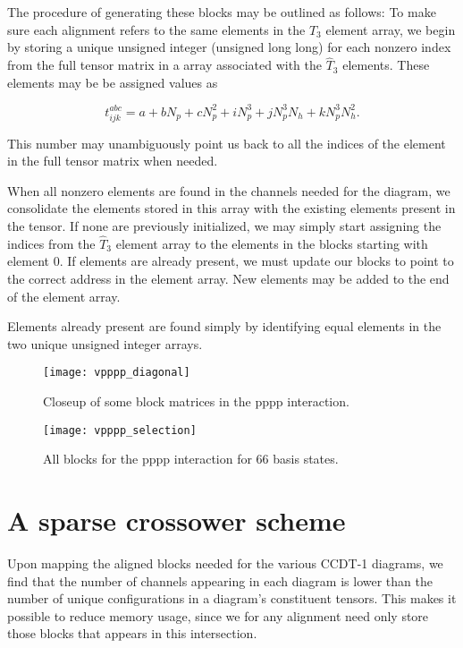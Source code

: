 The procedure of generating these blocks may be outlined as follows: To make sure each alignment refers to the same elements in the $\hat{T}_3$ element array, we begin by storing a unique unsigned integer (unsigned long long) for each nonzero index from the full tensor matrix in a array associated with the $\hat{T}_3$ elements. These elements may be be assigned values as

\begin{equation}
t^{abc}_{ijk} = a+ bN_p + cN_p^2 + iN_p^3 + jN_p^3 N_h+ kN_p^3 N_h^2.
\end{equation}

This number may unambiguously point us back to all the indices of the element in the full tensor matrix when needed.

When all nonzero elements are found in the channels needed for the diagram, we consolidate the elements stored in this array with the existing elements present in the tensor. If none are previously initialized, we may simply start assigning the indices from the $\hat{T}_3$ element array to the elements in the blocks starting with element 0. If elements are already present, we must update our blocks to point to the correct address in the element array. New elements may be added to the end of the element array.

Elements already present are found simply by identifying equal elements in the two unique unsigned integer arrays.



\begin{figure}[hbtp]
    \centering
    \texttt{[image: vpppp\_diagonal]}
    \caption{Closeup of some block matrices in the pppp interaction.}
    \label{fig:vpppp_diagonal}
\end{figure}

\begin{figure}[hbtp]
    \centering
    \texttt{[image: vpppp\_selection]}
    \caption{All blocks for the pppp interaction for 66 basis states.}
    \label{fig:vpppp_selection}
\end{figure}



\section{A sparse crossower scheme}

Upon mapping the aligned blocks needed for the various CCDT-1
diagrams, we find that the number of channels appearing in each
diagram is lower than the number of unique configurations in a
diagram's constituent tensors. This makes it possible to reduce memory
usage, since we for any alignment need only store those blocks that
appears in this intersection.


